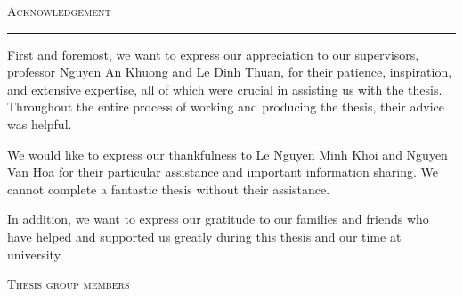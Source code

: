 \thispagestyle{empty}
\vspace*{3cm}
\noindent\Huge\textsc{Acknowledgement}\\
\normalsize
\noindent\rule[2pt]{\textwidth}{0.8pt}
\hspace*{5cm}
 
First and foremost, we want to express our appreciation to our supervisors, professor Nguyen An Khuong and Le Dinh Thuan, for their patience, inspiration, and extensive expertise, all of which were crucial in assisting us with the thesis. Throughout the entire process of working and producing the thesis, their advice was helpful.

We would like to express our thankfulness to Le Nguyen Minh Khoi and Nguyen Van Hoa for their particular assistance and important information sharing. We cannot complete a fantastic thesis without their assistance.


In addition, we want to express our gratitude to our families and friends who have helped and supported us greatly during this thesis and our time at university.
	
	\hfill \textsc{Thesis group members}
	
\cleardoublepage
